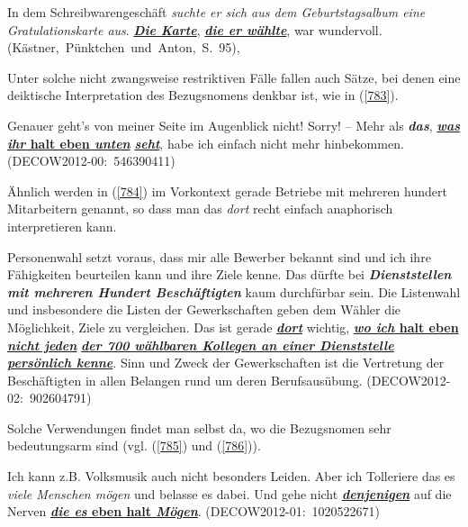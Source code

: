 \begin{exe}
	\ex\label{782} 
	\scriptsize
	In dem Schreibwarengeschäft \textit{suchte er sich aus dem Geburtstagsalbum eine Gratulationskarte aus}. 						\underline{\textbf{\textit{Die Karte}}}, \underline{\textbf{\textit{die er wählte}}}, war wundervoll.               
	\hfill\hbox {(Kästner, Pünktchen und Anton, S. 95), \citet[115]{Mikame1998}}
\end{exe}	
Unter solche nicht zwangsweise restriktiven Fälle fallen auch Sätze, bei denen eine deiktische Interpretation des Bezugsnomens denkbar ist, wie in (\ref{783}).

\begin{exe}
	\ex\label{783} 
	\scriptsize
	Genauer geht's von meiner Seite im Augenblick nicht! Sorry! – Mehr als \textbf{\textit{das}}, \underline{\textbf{\textit{was ihr} halt eben \textit{unten}}} \underline{\textbf{\textit{seht}}}, habe ich einfach nicht mehr hinbekommen.              
	\hfill\hbox {(DECOW2012-00: 546390411)}
\end{exe}
Ähnlich werden in (\ref{784}) im Vorkontext gerade Betriebe mit mehreren hundert Mitarbeitern genannt, so dass man das \textit{dort} recht einfach anaphorisch interpretieren kann.

\begin{exe}
	\ex\label{784} 
	\scriptsize
	Personenwahl setzt voraus, dass mir alle Bewerber bekannt sind und ich ihre Fähigkeiten beurteilen kann und ihre Ziele 			kenne. Das dürfte bei \textbf{\textit{Dienststellen mit mehreren Hundert Beschäftigten}} kaum durchfürbar sein. Die 			Listenwahl und insbesondere die Listen der Gewerk\-schaften geben dem Wähler die Möglichkeit, Ziele zu vergleichen. Das ist gerade \underline{\textit{\textbf{dort}}} wichtig, \underline{\textbf{\textit{wo ich} halt eben \textit{nicht jeden}}} \underline{\textbf{\textit{der 700 wählbaren Kollegen an 		einer Dienststelle persönlich kenne}}}. Sinn und Zweck der Ge\-werkschaften ist die Vertretung der Beschäftigten in allen 			Belangen rund um deren Berufsausübung.                                                 
	\newline
	\hbox{}\hfill\hbox{(DECOW2012-02: 902604791)}
\end{exe}
Solche Verwendungen findet man selbst da, wo die Bezugsnomen sehr bedeutungsarm sind (vgl. (\ref{785}) und (\ref{786})).

\begin{exe}
	\ex\label{785} 
	\scriptsize
	Ich kann z.B. Volksmusik auch nicht besonders Leiden. Aber ich Tolleriere das es \textit{viele Menschen mögen} und belasse 		es dabei. Und gehe nicht \underline{\textbf{\textit{denjenigen}}} auf die Nerven \underline{\textbf{\textit{die es} eben 		halt \textit{Mögen}}}.                                                    
	\newline
	\hbox{}\hfill\hbox{(DECOW2012-01: 1020522671)}
\end{exe}

